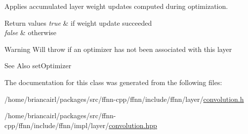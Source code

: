 Applies accumulated layer weight updates computed during optimization. 


\begin{DoxyRetVals}{Return values}
{\em true} & if weight update succeeded \\
\hline
{\em false} & otherwise \\
\hline
\end{DoxyRetVals}
\begin{DoxyWarning}{Warning}
Will throw if an optimizer has not been associated with this layer 
\end{DoxyWarning}
\begin{DoxySeeAlso}{See Also}
set\-Optimizer 
\end{DoxySeeAlso}


The documentation for this class was generated from the following files\-:\begin{DoxyCompactItemize}
\item 
/home/briancairl/packages/src/ffnn-\/cpp/ffnn/include/ffnn/layer/\hyperlink{convolution_8h}{convolution.\-h}\item 
/home/briancairl/packages/src/ffnn-\/cpp/ffnn/include/ffnn/impl/layer/\hyperlink{impl_2layer_2convolution_8hpp}{convolution.\-hpp}\end{DoxyCompactItemize}
